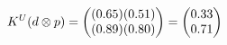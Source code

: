 \documentclass[preview]{standalone}
\begin{document}
\begin{align*}
\special{dvisvgm:raw <g id='unique000'>}K^U(d \otimes p) = \begin{pmatrix} (0.65)(0.51) \\ (0.89)(0.80) \end{pmatrix} = \begin{pmatrix} 0.33 \\ 0.71 \end{pmatrix}\special{dvisvgm:raw </g>}
\end{align*}
\end{document}
